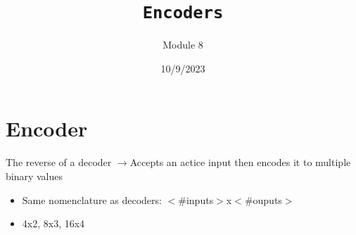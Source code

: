 \documentclass[a4paper,12pt]{article}
\title{\texttt{Encoders}\\\hrulefill}
\author{Module 8}
\date{\small{10/9/2023}}
\newcommand{\ra}{$\rightarrow$}
\begin{document}
    \maketitle

    \section{Encoder}
        The reverse of a decoder \ra Accepts an actice input then encodes it to multiple binary values
        \begin{itemize}
            \item Same nomenclature as decoders: $<$\#inputs$>$x$<$\#ouputs$>$
            \item 4x2, 8x3, 16x4
        \end{itemize}
\end{document}
